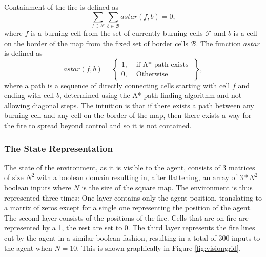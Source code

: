 Containment of the fire is defined as
\begin{equation}\label{eq:containment}
    \sum_{f \in \mathcal{F}} \sum_{b \in \mathcal{B}} astar(f, b) = 0,
\end{equation}
where $f$ is a burning cell from the set of currently burning cells $\mathcal{F}$ and $b$ is a cell on the border of the map from the fixed set of border cells $\mathcal{B}$. The function $astar$ is defined as
\begin{equation}\label{eq:astar}
    astar(f, b) = \left\{
        \begin{array}{lr}
            1, & \text{ if A* path exists }\\
            0, & \text{ Otherwise }
        \end{array}\right\},
\end{equation}
where a path is a sequence of directly connecting cells starting with cell $f$ and ending with cell $b$, determined using the A* path-finding algorithm and not allowing diagonal steps. The intuition is that if there exists a path between any burning cell and any cell on the border of the map, then there exists a way for the fire to spread beyond control and so it is not contained.


\subsubsection{The State Representation}\label{sec:state_rep}
The state of the environment, as it is visible to the agent, consists of 3 matrices of size $N^2$ with a boolean domain resulting in, after flattening, an array of $3 * N^2$ boolean inputs where $N$ is the size of the square map. The environment is thus represented three times: One layer contains only the agent position, translating to a matrix of zeros except for a single one representing the position of the agent. The second layer consists of the positions of the fire. Cells that are on fire are represented by a 1, the rest are set to 0. The third layer represents the fire lines cut by the agent in a similar boolean fashion, resulting in a total of 300 inputs to the agent when $N=10$. This is shown graphically in Figure \ref{fig:visiongrid}.

